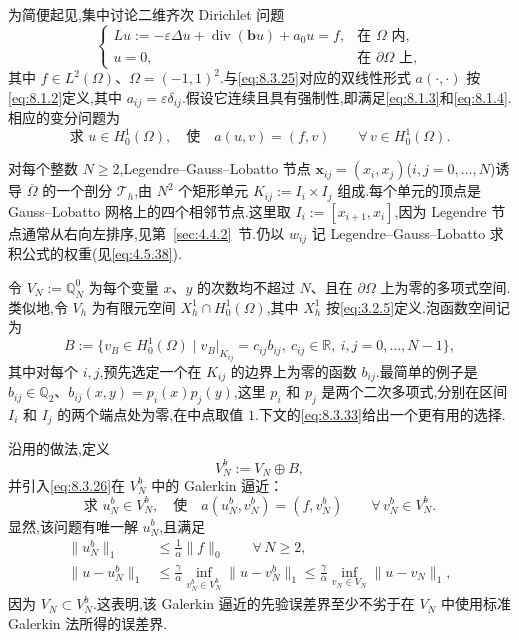 为简便起见,集中讨论二维齐次 Dirichlet 问题
\begin{equation}\label{eq:8.3.25}
  \begin{cases}
    Lu:=-\varepsilon\Delta u+\operatorname{div}(\boldsymbol{b}u)+a_0u=f,
       &\text{在 }\Omega\text{ 内},\\
    u=0,&\text{在 }\partial\Omega\text{ 上},
  \end{cases}
\end{equation}
其中 \(f\in L^2(\Omega)\)、\(\Omega=(-1,1)^2\).与\eqref{eq:8.3.25}对应的双线性形式 \(a(\cdot,\cdot)\) 按\eqref{eq:8.1.2}定义,其中 \(a_{ij}=\varepsilon\delta_{ij}\).假设它连续且具有强制性,即满足\eqref{eq:8.1.3}和\eqref{eq:8.1.4}.相应的变分问题为
\begin{equation}\label{eq:8.3.26}
  \text{求 }u\in H_0^1(\Omega),\quad\text{使}\quad
    a(u,v)=(f,v)\qquad\forall\,v\in H_0^1(\Omega).
\end{equation}

对每个整数 \(N\ge2\),Legendre--Gauss--Lobatto 节点 \(\boldsymbol{x}_{ij}=(x_i,x_j)\)(\(i,j=0,\ldots,N\))诱导 \(\overline\Omega\) 的一个剖分 \(\mathcal T_h\),由 \(N^2\) 个矩形单元 \(K_{ij}:=I_i\times I_j\) 组成.每个单元的顶点是 Gauss--Lobatto 网格上的四个相邻节点.这里取 \(I_i:=[x_{i+1},x_i]\),因为 Legendre 节点通常从右向左排序,见第~\ref{sec:4.4.2}~节.仍以 \(w_{ij}\) 记 Legendre--Gauss--Lobatto 求积公式的权重(见\eqref{eq:4.5.38}).

令 \(V_N:=\mathbb Q_N^0\) 为每个变量 \(x\)、\(y\) 的次数均不超过 \(N\)、且在 \(\partial\Omega\) 上为零的多项式空间.类似地,令 \(V_h\) 为有限元空间 \(X_h^1\cap H_0^1(\Omega)\),其中 \(X_h^1\) 按\eqref{eq:3.2.5}定义.泡函数空间记为
\begin{equation}\label{eq:8.3.27}
  B:=\{v_B\in H_0^1(\Omega)\mid v_B|_{K_{ij}}=c_{ij}b_{ij},\
          c_{ij}\in\mathbb R,\ i,j=0,\ldots,N-1\},
\end{equation}
其中对每个 \(i,j\),预先选定一个在 \(K_{ij}\) 的边界上为零的函数 \(b_{ij}\).最简单的例子是 \(b_{ij}\in\mathbb Q_2\)、\(b_{ij}(x,y)=p_i(x)p_j(y)\),这里 \(p_i\) 和 \(p_j\) 是两个二次多项式,分别在区间 \(I_i\) 和 \(I_j\) 的两个端点处为零,在中点取值 \(1\).下文的\eqref{eq:8.3.33}给出一个更有用的选择.

沿用的做法,定义
\begin{equation}\label{eq:8.3.28}
  V_N^b:=V_N\oplus B,
\end{equation}
并引入\eqref{eq:8.3.26}在 \(V_N^b\) 中的 Galerkin 逼近：
\begin{equation}\label{eq:8.3.29}
  \text{求 }u_N^b\in V_N^b,\quad\text{使}\quad
    a(u_N^b,v_N^b)=(f,v_N^b)\qquad\forall\,v_N^b\in V_N^b.
\end{equation}
显然,该问题有唯一解 \(u_N^b\),且满足
\begin{align}
  \|u_N^b\|_1&\le\frac1\alpha\|f\|_0\qquad\forall\,N\ge2,\label{eq:8.3.30}\\
  \|u-u_N^b\|_1&\le\frac{\gamma}{\alpha}\inf_{v_N^b\in V_N^b}\|u-v_N^b\|_1
      \le\frac{\gamma}{\alpha}\inf_{v_N\in V_N}\|u-v_N\|_1,\label{eq:8.3.31}
\end{align}
因为 \(V_N\subset V_N^b\).这表明,该 Galerkin 逼近的先验误差界至少不劣于在 \(V_N\) 中使用标准 Galerkin 法所得的误差界.

